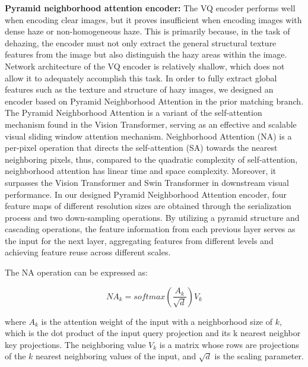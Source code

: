 \documentclass[lettersize,journal]{IEEEtran}
\begin{document}
{\bf{Pyramid neighborhood attention encoder:}}
The VQ encoder performs well when encoding clear images, but it proves insufficient when encoding images with dense haze or non-homogeneous haze. This is primarily because, in the task of dehazing, the encoder must not only extract the general structural texture features from the image but also distinguish the hazy areas within the image. Network architecture of the VQ encoder is relatively shallow, which does not allow it to adequately accomplish this task. In order to fully extract global features such as the texture and structure of hazy images, we designed an encoder based on Pyramid Neighborhood Attention in the prior matching branch. The Pyramid Neighborhood Attention is a variant of the self-attention mechanism found in the Vision Transformer\cite{dosovitskiy2020image}, serving as an effective and scalable visual sliding window attention mechanism. Neighborhood Attention (NA)\cite{hassani2023neighborhood, hassani2022dilated} is a per-pixel operation that directs the self-attention (SA)\cite{vaswani2017attention} towards the nearest neighboring pixels, thus, compared to the quadratic complexity of self-attention, neighborhood attention has linear time and space complexity. Moreover, it surpasses the Vision Transformer and Swin Transformer\cite{liu2021swin} in downstream visual performance. In our designed Pyramid Neighborhood Attention encoder, four feature maps of different resolution sizes are obtained through the serialization process and two down-sampling operations. By utilizing a pyramid structure and cascading operations, the feature information from each previous layer serves as the input for the next layer, aggregating features from different levels and achieving feature reuse across different scales.

The NA operation can be expressed as:

\begin{equation}
	\label{NA_operation}
	NA_{k} = softmax (\frac{A_{k}}{\sqrt{d}}) V_{k}
\end{equation}

where $A_{k}$ is the attention weight of the input with a neighborhood size of $k$, which is the dot product of the input query projection and its k nearest neighbor key projections. The neighboring value $V_k$ is a matrix whose rows are projections of the $k$ nearest neighboring values of the input, and $\sqrt{d}$ is the scaling parameter.
\end{document}
